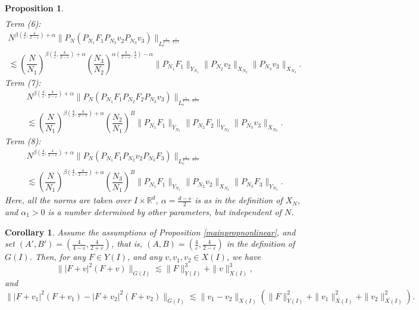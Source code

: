 \documentclass[aihp]{imsart}
\numberwithin{equation}{section}
\theoremstyle{plain}
\newtheorem{prop}[thm]{Proposition}
\newtheorem{cor}[thm]{Corollary}
\theoremstyle{remark}
\newcommand{\R}{\mathbb{R}}
\begin{document}
\begin{prop}
\begin{multline*}
\end{multline*}
\noindent
Term (6):
\begin{multline*}
N^{\beta (\frac{4}{\varepsilon},\frac{4}{2-\varepsilon}) +\alpha} \|P_N (P_{N_1} F_1 P_{N_2} v_2 P_{N_3} v_3) \|_{L_e^{\frac{4}{4-\varepsilon} , \frac{4}{2+\varepsilon}} }\\
 \lesssim \left(\dfrac{N}{N_1}\right)^{\beta (\frac{4}{\varepsilon},\frac{4}{2-\varepsilon})+\alpha} \left(\dfrac{N_3}{N_2}\right)^{\alpha  (\frac{4}{2-\varepsilon},\frac{4}{\varepsilon}) -\alpha} \|P_{N_1}F_1\|_{Y_{N_1}}\|P_{N_2}v_2\|_{X_{N_2}} \|P_{N_3}v_3\|_{X_{N_3}}.  
\end{multline*}
\noindent
Term (7):
\begin{multline*}
N^{\beta (\frac{4}{\varepsilon},\frac{4}{2-\varepsilon}) +\alpha} \|P_N (P_{N_1} F_1 P_{N_2} F_2 P_{N_3} v_3) \|_{L_e^{\frac{4}{4-\varepsilon} , \frac{4}{2+\varepsilon}} }\\
 \lesssim \left(\dfrac{N}{N_1}\right)^{\beta  (\frac{4}{\varepsilon},\frac{4}{2-\varepsilon})+\alpha} \left(\dfrac{N_2}{N_1}\right)^{B} \|P_{N_1}F_1\|_{Y_{N_1}}\|P_{N_2}F_2\|_{Y_{N_2}} \|P_{N_3}v_3\|_{X_{N_3}}.  
\end{multline*}
\noindent
Term (8):
\begin{multline*}
N^{\beta (\frac{4}{\varepsilon},\frac{4}{2-\varepsilon}) +\alpha} \|P_N (P_{N_1} F_1 P_{N_2} v_2 P_{N_3} F_3) \|_{L_e^{\frac{4}{4-\varepsilon} , \frac{4}{2+\varepsilon}} }\\
 \lesssim \left(\dfrac{N}{N_1}\right)^{\beta  (\frac{4}{\varepsilon},\frac{4}{2-\varepsilon})+\alpha} \left(\dfrac{N_3}{N_1}\right)^{B} \|P_{N_1}F_1\|_{Y_{N_1}}\|P_{N_2}v_2\|_{X_{N_2}} \|P_{N_3}F_3\|_{Y_{N_3}}.  
\end{multline*}
Here, all the norms are taken over $I\times \R^d$, $\alpha = \frac{d-s}{2}$ is as in the definition of $X_N$, and $\alpha_1>0$
is a number determined by other parameters, but independent of $N$. 
\end{prop}

\begin{cor}\label{cor:wis}
Assume the assumptions of Proposition \ref{mainpropnonlinear}, and set $(A', B') = (\frac{4}{4 - \varepsilon}, \frac{4}{2 + \varepsilon})$, that is, $(A, B) = (\frac{4}{\varepsilon}, \frac{4}{2 - \varepsilon})$ 
in the definition of $G(I)$. Then, 
for any $F\in Y(I)$, and any $v,v_1,v_2\in X(I)$, we have
$$\||F+v|^2 (F+v)\|_{G(I)}\lesssim \|F\|_{Y(I)}^3 +\|v\|_{X(I)}^3,$$
and
\begin{equation*}
\||F+v_1|^2 (F+v_1) - |F+v_2|^2 (F+v_2) \|_{G(I)}
\lesssim \|v_1 - v_2\|_{X(I)} (\|F\|^2_{Y(I)} +\|v_1\|_{X(I)}^2 +\|v_2\|_{X(I)}^2).
\end{equation*}
\end{cor}
\end{document}
